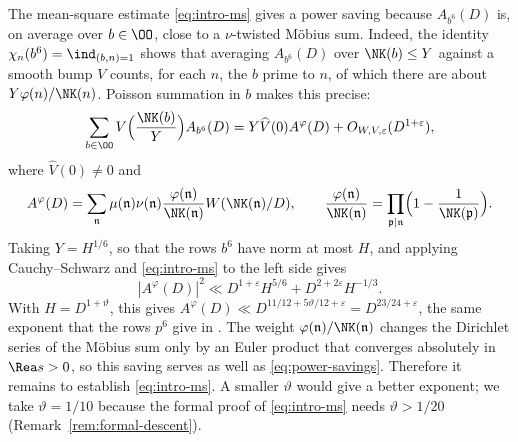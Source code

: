The mean-square estimate \eqref{eq:intro-ms} gives a power saving because $A_{b^6}(D)$ is, on average over $b\in\OO$, close to a $\nu$-twisted M\"obius sum. Indeed, the identity $\chi_n(b^6)=\ind_{(b,n)=1}$ shows that averaging $A_{b^6}(D)$ over $\NK(b)\le Y$ against a smooth bump $V$ counts, for each $n$, the $b$ prime to $n$, of which there are about $Y\varphi(n)/\NK(n)$. Poisson summation in $b$ makes this precise:
\begin{equation}\label{eq:intro-average}
 \sum_{b\in\OO}V\Bigl(\frac{\NK(b)}{Y}\Bigr)A_{b^6}(D)=Y\widehat V(0)A^\varphi(D)+O_{W,V,\varepsilon}(D^{1+\varepsilon}),
\end{equation}
where $\widehat V(0)\ne0$ and
\[
 A^\varphi(D)=\sum_{\mathfrak n}\mu(\mathfrak n)\nu(\mathfrak n)\frac{\varphi(\mathfrak n)}{\NK(\mathfrak n)}W(\NK(\mathfrak n)/D),
 \qquad
 \frac{\varphi(\mathfrak n)}{\NK(\mathfrak n)}=\prod_{\mathfrak p\mid\mathfrak n}\Bigl(1-\frac1{\NK(\mathfrak p)}\Bigr).
\]
Taking $Y=H^{1/6}$, so that the rows $b^6$ have norm at most $H$, and applying Cauchy--Schwarz and \eqref{eq:intro-ms} to the left side gives
\begin{equation}\label{eq:intro-extraction}
|A^\varphi(D)|^2
\ll D^{1+\varepsilon}H^{5/6}+D^{2+2\varepsilon}H^{-1/3}.
\end{equation}
With $H=D^{1+\vartheta}$, this gives
$A^\varphi(D)\ll D^{11/12+5\vartheta/12+\varepsilon}=D^{23/24+\varepsilon}$, the same exponent that the rows $p^6$ give in \cite{OpenAI26b}. The weight $\varphi(\mathfrak n)/\NK(\mathfrak n)$ changes the Dirichlet series of the M\"obius sum only by an Euler product that converges absolutely in $\Rea s>0$, so this saving serves as well as \eqref{eq:power-savings}.
Therefore it remains to establish \eqref{eq:intro-ms}. A smaller $\vartheta$ would give a better exponent; we take $\vartheta=1/10$ because the formal proof of \eqref{eq:intro-ms} needs $\vartheta>1/20$ (Remark~\ref{rem:formal-descent}).

